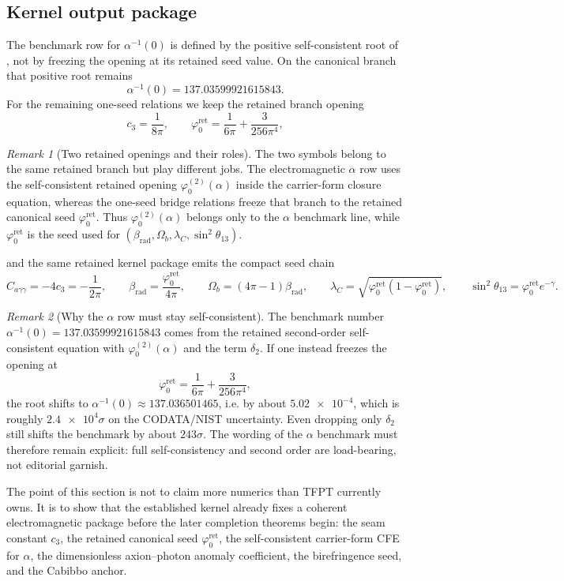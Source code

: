 \documentclass[11pt,a4paper]{article}
\theoremstyle{definition}
\theoremstyle{remark}
\newtheorem*{remark}{Remark}
\newcommand{\cthree}{c_3}
\newcommand{\phiz}{\varphi_0^{\mathrm{ret}}}
\newcommand{\phiztwo}{\varphi_0^{(2)}}
\begin{document}
\subsection{Kernel output package}

The benchmark row for $\alpha^{-1}(0)$ is defined by the positive self-consistent root of , not by freezing the opening at its retained seed value. On the canonical branch that positive root remains
\[
\alpha^{-1}(0)=\num{137.03599921615843}.
\]
For the remaining one-seed relations we keep the retained branch opening
\begin{equation}
\label{eq:hard-kernel-values}
\cthree=\frac{1}{8\pi},
\qquad
\phiz=\frac{1}{6\pi}+\frac{3}{256\pi^4},
\end{equation}
\begin{remark}[Two retained openings and their roles]
The two symbols belong to the same retained branch but play different jobs. The electromagnetic $\alpha$ row uses the self-consistent retained opening $\phiztwo(\alpha)$ inside the carrier-form closure equation, whereas the one-seed bridge relations freeze that branch to the retained canonical seed $\phiz$. Thus $\phiztwo(\alpha)$ belongs only to the $\alpha$ benchmark line, while $\phiz$ is the seed used for $(\beta_{\mathrm{rad}},\Omega_b,\lambda_C,\sin^2\theta_{13})$.
\end{remark}
and the same retained kernel package emits the compact seed chain
\begin{equation}
\label{eq:kernel-benchmark-formulas}
C_{a\gamma\gamma}=-4\cthree=-\frac{1}{2\pi},
\qquad
\beta_{\mathrm{rad}}=\frac{\phiz}{4\pi},
\qquad
\Omega_b=(4\pi-1)\beta_{\mathrm{rad}},
\qquad
\lambda_C=\sqrt{\phiz(1-\phiz)},
\qquad
\sin^2\theta_{13}=\phiz e^{-\gamma}.
\end{equation}
\begin{remark}[Why the $\alpha$ row must stay self-consistent]
The benchmark number $\alpha^{-1}(0)=\num{137.03599921615843}$ comes from the retained second-order self-consistent equation with $\phiztwo(\alpha)$ and the term $\delta_2$. If one instead freezes the opening at
\[
\phiz=\frac{1}{6\pi}+\frac{3}{256\pi^4},
\]
the root shifts to $\alpha^{-1}(0)\approx \num{137.036501465}$, i.e. by about $\num{5.02e-4}$, which is roughly $\num{2.4e4}\sigma$ on the CODATA/NIST uncertainty. Even dropping only $\delta_2$ still shifts the benchmark by about $243\sigma$. The wording of the $\alpha$ benchmark must therefore remain explicit: full self-consistency and second order are load-bearing, not editorial garnish.
\end{remark}
\begin{tcolorbox}[colback=blue!3, colframe=blue!50!black, breakable,
    title={\textbf{Kernel-output package}}, fonttitle=\bfseries]
The point of this section is not to claim more numerics than TFPT currently owns. It is to show that the established kernel already fixes a coherent electromagnetic package before the later completion theorems begin: the seam constant $\cthree$, the retained canonical seed $\phiz$, the self-consistent carrier-form CFE for $\alpha$, the dimensionless axion--photon anomaly coefficient, the birefringence seed, and the Cabibbo anchor.
\end{tcolorbox}
\end{document}
